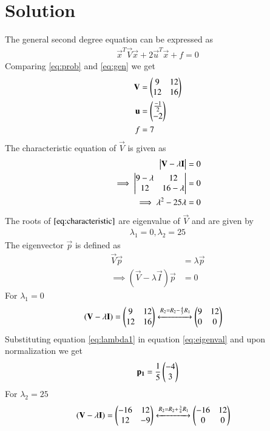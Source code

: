 \documentclass[journal,12pt,twocolumn]{IEEEtran}
\begin{document}
\section{\textbf{Solution}}
\renewcommand{\thefigure}{\arabic{figure}}
The general second degree equation can be expressed as
\begin{align}
    \vec{x}^T\vec{V}\vec{x}+2\vec{u}^T\vec{x}+f = 0\label{eq:gen}
\end{align}
Comparing \eqref{eq:prob} and \eqref{eq:gen} we get
\begin{align}
    \mathbf{V}&=\begin{pmatrix}9 & 12 \\ 12 & 16\end{pmatrix}\label{eq:V}\\
    \mathbf{u}&=\begin{pmatrix}\frac{-1}{2} \\ -2\end{pmatrix}\label{eq:u}\\
    f&=7\label{eq:f}
\end{align}
The characteristic equation of $\vec{V}$ is given as
\begin{align}
    \begin{vmatrix}\mathbf{V}-\lambda\mathbf{I}\end{vmatrix}&=0\\
    \implies\begin{vmatrix}9-\lambda & 12\\12&16-\lambda\end{vmatrix}&=0\\
    \implies\lambda^2-25\lambda&=0\label{eq:characteristic}
\end{align}
The roots of $\eqref{eq:characteristic}$ are eigenvalue of $\vec{V}$ and are given by
\begin{align*}
    \lambda_1=0,\lambda_2=25
\end{align*}
The eigenvector $\vec{p}$ is defined as
\begin{align}
    \vec{V}\vec{p}&=\lambda\vec{p}\\
    \implies(\vec{V}-\lambda\vec{I})\vec{p}&=0\label{eq:eigenval}
\end{align}
For $\lambda_1=0$
\begin{align}
    &(\mathbf{V}-\lambda\mathbf{I})=\begin{pmatrix}9&12\\12&16\end{pmatrix}\xleftrightarrow{R_2=R_2-\frac{4}{3}R_1}\begin{pmatrix}9&12\\0&0\end{pmatrix}\label{eq:lambda1}
\end{align}
Substituting equation \eqref{eq:lambda1} in equation \eqref{eq:eigenval} and upon normalization we get
\begin{align}
    \mathbf{p_1} = \frac{1}{5}\begin{pmatrix}-4\\3\end{pmatrix}\label{eq:p1}
\end{align}
For $\lambda_2=25$
\begin{align}
    &(\mathbf{V}-\lambda\mathbf{I})=\begin{pmatrix}-16&12\\12&-9\end{pmatrix}\xleftrightarrow{R_2=R_2+\frac{3}{4}R_1}\begin{pmatrix}-16&12\\0&0\end{pmatrix}\label{eq:lambda2}
\end{align}
\end{document}

